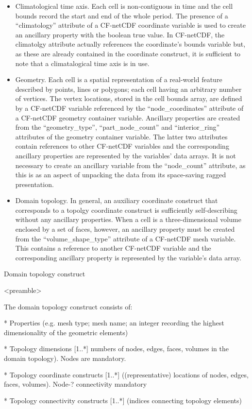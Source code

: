 \begin{itemize}

\item Climatological time axis. Each cell is non-contiguous in time
  and the cell bounds record the start and end of the whole
  period. The presence of a ``climatology'' attribute of a CF-netCDF
  coordinate variable is used to create an ancillary property with the
  boolean true value. In CF-netCDF, the climatolgy attribute actually
  references the coordinate's bounds variable but, as these are
  already contained in the coordinate construct, it is sufficient to
  note that a climatalogical time axis is in use.
  
\item Geometry. Each cell is a spatial representation of a real-world
  feature described by points, lines or polygons; each cell having an
  arbitrary number of vertices. The vertex locations, stored in the
  cell bounds array, are defined by a CF-netCDF variable referenced by
  the ``node\_coordinates'' attribute of a CF-netCDF geometry
  container variable. Ancillary properties are created from the
  ``geometry\_type'', ``part\_node\_count'' and ``interior\_ring''
  attributes of the geometry container variable. The latter two
  attributes contain references to other CF-netCDF variables and the
  corresponding ancillary properties are represented by the variables'
  data arrays. It is not necessary to create an ancillary variable
  from the ``node\_count'' attribute, as this is as an aspect of
  unpacking the data from its space-saving ragged presentation.

\item Domain topology. In general, an auxiliary coordinate construct
  that corresponds to a topolgy coordinate construct is sufficiently
  self-describing without any ancillary properties. When a cell is a
  three-dimensional volume enclosed by a set of faces, however, an
  ancillary property must be created from the ``volume\_shape\_type''
  attribute of a CF-netCDF mesh variable. This contains a reference to
  another CF-netCDF variable and the corresponding ancillary property
  is represented by the variable's data array.
  
\end{itemize}

Domain topology construct

<preamble>

The domain topology construct consists of:

* Properties (e.g. mesh type; mesh name; an integer recording the
  highest dimensionality of the geometric elements)

* Topology dimensions [1..*] numbers of nodes, edges, faces, volumes in the
  domain topology). Nodes are mandatory.

* Topology coordinate constructs [1..*] ((representative) locations
  of nodes, edges, faces, volumes). Node-? connectivity mandatory

* Topology connectivity constructs [1..*] (indices connecting topology elements)


